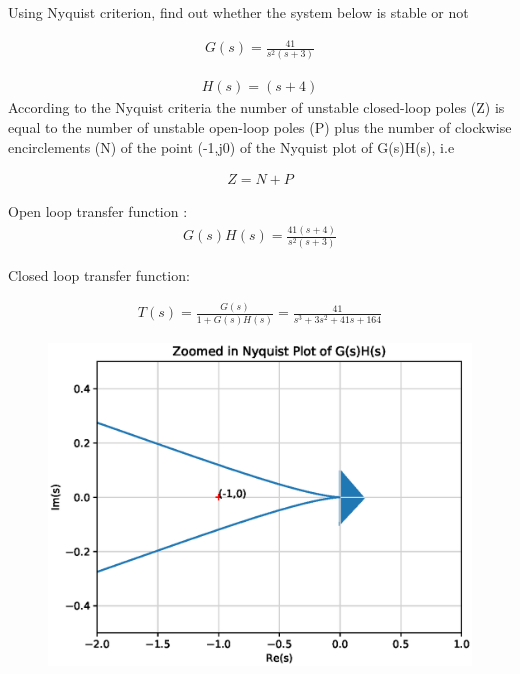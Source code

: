 \item Using Nyquist criterion, find out whether the system below is stable or not

\begin{align}
    G(s)= \frac{41}{s^2(s+3)}
    \label{eq:ee18btech11041_1}
\end{align}

\begin{align}
    H(s)= (s+4)
    \label{eq:ee18btech11041_2}
\end{align}
\solution 
According to the Nyquist criteria the number of unstable closed-loop poles (Z) is equal to the number of unstable open-loop poles (P) plus the number of clockwise encirclements (N) of the point (-1,j0) of the Nyquist plot of G(s)H(s), i.e

\begin{align}
    Z=N+P
    \label{eq:ee18btech11041_3}
\end{align}

Open loop transfer function :
\begin{align}
    G(s)H(s)=\frac{41(s+4)}{s^2(s+3)}
    \label{eq:ee18btech11041_4}
\end{align}

Closed loop transfer function:

\begin{align}
   T(s)= \frac{G(s)}{1+G(s)H(s)}=\frac{41}{s^3+3s^2+41s+164}
\end{align}


\begin{figure}[!h]
    \includegraphics[width=\columnwidth]{./figs/ee18btech11041_1.eps}
    \caption{}
    \label{fig:ee18btech11041_fig1}
\end{figure}



